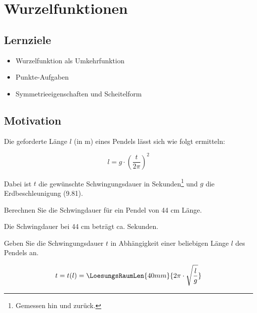 \section{Wurzelfunktionen}


\subsection*{Lernziele}

\begin{itemize}
\item Wurzelfunktion als Umkehrfunktion
\item Punkte-Aufgaben
\item Symmetrieeigenschaften und Scheitelform
\end{itemize}

\newpage

\subsection{Motivation}

Die geforderte Länge $l$ (in m) eines Pendels lässt sich wie folgt ermitteln:

$$l = g \cdot{} \left(\frac{t}{2\pi}\right)^2$$


Dabei ist $t$ die gewünschte Schwingungsdauer in
Sekunden\footnote{Gemessen hin und zurück.} und $g$ die
Erdbeschleunigung (9.81).

Berechnen Sie die Schwingdauer für ein Pendel von 44 cm Länge.

\vspace{4mm}

Die Schwingdauer bei 44 cm beträgt ca.  Sekunden.


Geben Sie die Schwingungsdauer $t$ in Abhängigkeit einer beliebigen
Länge $l$ des Pendels an.

$$t = t(l) = \LoesungsRaumLen{40mm}{2\pi \cdot{} \sqrt{\frac{l}{g}}}$$




\newpage

